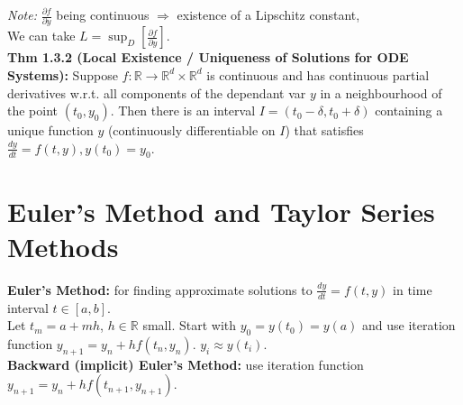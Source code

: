 \documentclass[10pt,a4paper]{article}
\newcommand{\R}{\mathbb{R}}
\renewcommand{\implies}{\Rightarrow}
\newcommand{\del}{\partial}
\begin{document}
\begin{multicols*}{2}
\textit{Note:} $\frac{\del f}{\del y}$ being continuous $\implies$ existence of a Lipschitz constant,\\
We can take $L = \sup_D\left[\frac{\del f}{\del y}\right]$.\\
\textbf{Thm 1.3.2 (Local Existence / Uniqueness of Solutions for ODE Systems):} Suppose $f : \R \to \R^d \times \R^d$ is continuous and has continuous partial derivatives w.r.t. all components of the dependant var $y$ in a neighbourhood of the point $(t_0, y_0)$. Then there is an interval $I = (t_0 - \delta, t_0 + \delta)$ containing a unique function $y$ (continuously differentiable on $I$) that satisfies $\frac{dy}{dt} = f(t,y), y(t_0)  = y_0$.\\


\section{Euler's Method and Taylor Series Methods}
\textbf{Euler's Method:} for finding approximate solutions to $\frac{dy}{dt} = f(t,y)$ in time interval $t \in [a,b]$. \\ Let $t_m = a + mh$, $h \in \R$ small. Start with $y_0 = y(t_0) = y(a)$ and use iteration function $\boxed{y_{n + 1} = y_n + hf(t_n, y_n)}$. $y_i \approx y(t_i)$.\\
\textbf{Backward (implicit) Euler's Method:} use iteration function $\boxed{y_{n + 1} = y_n + hf(t_{n+1}, y_{n+1})}$.\\


\end{multicols*}
\end{document}

